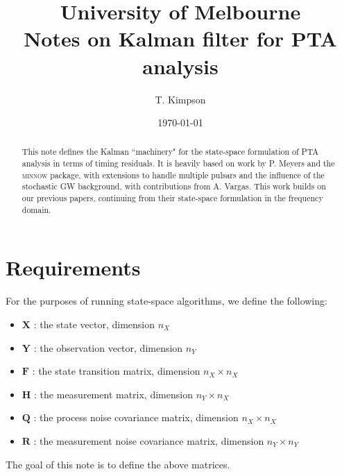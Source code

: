 \documentclass{tufte-handout} %
\title{	
	\normalfont\normalsize 
	{University of Melbourne} \\ 
	 Notes on Kalman filter for PTA analysis
}\author{\small T. Kimpson} %
\date{\small \today} %
\begin{document}
\maketitle
\begin{abstract}
	This note defines the Kalman ``machinery" for the state-space formulation of PTA analysis in terms of timing residuals. It is heavily based on work by P. Meyers and the \textsc{minnow} package, with extensions to handle multiple pulsars and the influence of the stochastic GW background, with contributions from A. Vargas. This work builds on our previous papers, continuing from their state-space formulation in the frequency domain.
\end{abstract}
\tableofcontents





\section{Requirements}

For the purposes of running state-space algorithms, we define the following:

\begin{itemize}
	\item $\boldsymbol{X}$ : the state vector, dimension $n_X$
	\item $\boldsymbol{Y}$ : the observation vector, dimension $n_Y$
	\item $\boldsymbol{F}$ : the state transition matrix, dimension $n_X \times n_X$
	\item $\boldsymbol{H}$ : the measurement matrix, dimension $n_Y \times n_X$
	\item $\boldsymbol{Q}$ : the process noise covariance matrix, dimension $n_X \times n_X$
	\item $\boldsymbol{R}$ : the measurement noise covariance matrix, dimension $n_Y \times n_Y$
\end{itemize}

The goal of this note is to define the above matrices. 
\end{document}
